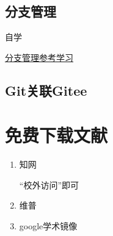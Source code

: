 \documentclass[12pt]{article}
\begin{document}
\subsection{分支管理}
自学

\href{https://www.liaoxuefeng.com/wiki/896043488029600/896954848507552}{分支管理参考学习}

\subsection{Git关联Gitee}

\section{免费下载文献}

\begin{enumerate}
    \item 知网

“校外访问”即可

    \item 维普
    \item google学术镜像
\end{enumerate}
\end{document}
